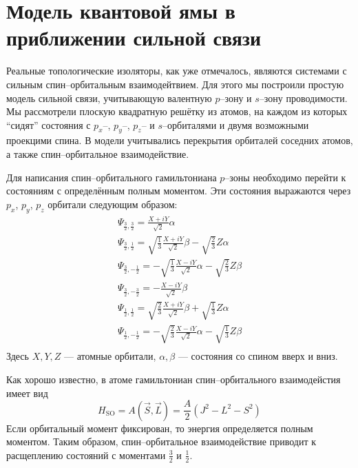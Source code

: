 \section{Модель квантовой ямы в приближении сильной связи}
Реальные топологические изоляторы, как уже отмечалось, являются системами с сильным 
спин--орбитальным взаимодейтвием. Для этого мы построили простую модель сильной связи,
учитывающую валентную $p$--зону и $s$--зону проводимости. Мы рассмотрели плоскую
квадратную решётку из атомов, на каждом из которых ``сидят'' состояния
с $p_x$--, $p_y$--, $p_z$-- и $s$--орбиталями и двумя 
возможными проекцими спина. В модели учитывались перекрытия
орбиталей соседних атомов, а также спин--орбитальное взаимодействие. 

Для написания
спин--орбитального гамильтониана $p$--зоны необходимо перейти к состояниям с определённым
полным моментом. Эти состояния выражаются через $p_x$, $p_y$, $p_z$ орбитали следующим образом:
\begin{equation}
	\label{transform1}
	\begin{gathered}
        \Psi_{\frac{3}{2},\frac{3}{2}} = \frac{X + iY}{\sqrt{2}}\alpha\\
        \Psi_{\frac{3}{2}, \frac{1}{2}} = \sqrt{\frac{1}{3}}\frac{X + iY}{\sqrt{2}}\beta -
                                         \sqrt{\frac{2}{3}} Z\alpha\\
        \Psi_{\frac{3}{2}, -\frac{1}{2}} = -\sqrt{\frac{1}{3}}\frac{X - iY}{\sqrt{2}}\alpha -
                                         \sqrt{\frac{2}{3}} Z\beta\\
        \Psi_{\frac{3}{2},-\frac{3}{2}} = -\frac{X - iY}{\sqrt{2}}\beta
	\end{gathered}
\end{equation}
\begin{equation}
	\label{transform2}
	\begin{gathered}
        \Psi_{\frac{1}{2}, \frac{1}{2}} = \sqrt{\frac{2}{3}}\frac{X + iY}{\sqrt{2}}\beta +
                                         \sqrt{\frac{1}{3}} Z\alpha\\
        \Psi_{\frac{1}{2}, -\frac{1}{2}} = -\sqrt{\frac{2}{3}}\frac{X - iY}{\sqrt{2}}\alpha-
                                         \sqrt{\frac{1}{3}} Z\beta\\
	\end{gathered}
\end{equation}
Здесь $X,Y,Z$ --- атомные орбитали, $\alpha,\beta$ --- состояния со спином вверх и вниз.

Как хорошо известно, в атоме гамильтониан спин--орбитального взаимодейстия имеет вид
\begin{equation}
    H_{\mathrm{SO}} =  A(\vec{S}, \vec{L}) = \frac{A}{2}(J^2 - L^2 - S^2)
\end{equation}
Если орбитальный момент фиксирован, то энергия определяется полным моментом. Таким образом,
спин--орбитальное взаимодействие приводит к расщеплению состояний с моментами $\frac32$ и
$\frac12$.

